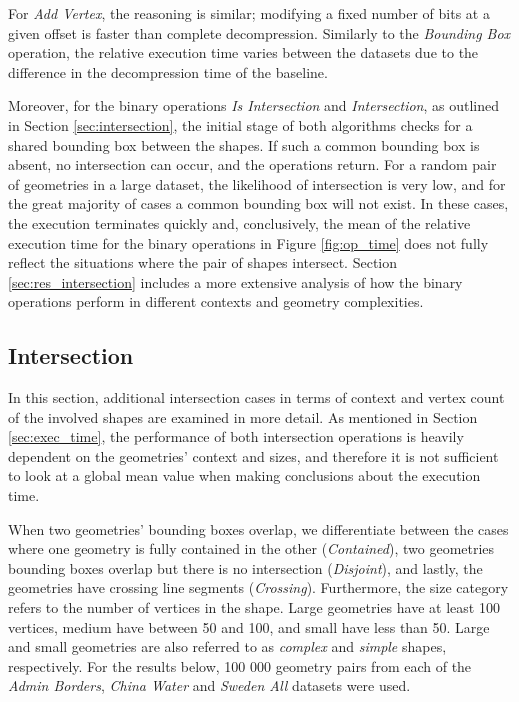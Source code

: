 For \textit{Add Vertex}, the reasoning is similar; modifying a fixed number of bits at a given offset is faster than complete decompression. Similarly to the \textit{Bounding Box} operation, the relative execution time varies between the datasets due to the difference in the decompression time of the baseline.

Moreover, for the binary operations \textit{Is Intersection} and \textit{Intersection}, as outlined in Section \ref{sec:intersection}, the initial stage of both algorithms checks for a shared bounding box between the shapes. If such a common bounding box is absent, no intersection can occur, and the operations return. For a random pair of geometries in a large dataset, the likelihood of intersection is very low, and for the great majority of cases a common bounding box will not exist. In these cases, the execution terminates quickly and, conclusively, the mean of the relative execution time for the binary operations in Figure \ref{fig:op_time} does not fully reflect the situations where the pair of shapes intersect. Section \ref{sec:res_intersection} includes a more extensive analysis of how the binary operations perform in different contexts and geometry complexities.




\subsection{Intersection}
\label{sec:intersection_results}
In this section, additional intersection cases in terms of context and vertex count of the involved shapes are examined in more detail. As mentioned in Section \ref{sec:exec_time}, the performance of both intersection operations is heavily dependent on the geometries' context and sizes, and therefore it is not sufficient to look at a global mean value when making conclusions about the execution time. 

When two geometries' bounding boxes overlap, we differentiate between the cases where one geometry is fully contained in the other (\textit{Contained}), two geometries bounding boxes overlap but there is no intersection (\textit{Disjoint}), and lastly, the geometries have crossing line segments (\textit{Crossing}). Furthermore, the size category refers to the number of vertices in the shape. Large geometries have at least 100 vertices, medium have between 50 and 100, and small have less than 50. Large and small geometries are also referred to as \textit{complex} and \textit{simple} shapes, respectively. For the results below, 100 000 geometry pairs from each of the \textit{Admin Borders}, \textit{China Water} and \textit{Sweden All} datasets were used.


